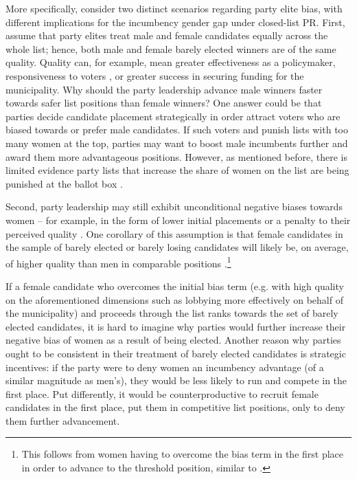 \documentclass[12pt]{article}
\begin{document}
More specifically, consider two distinct scenarios regarding party elite bias, with different implications for the incumbency gender gap under closed-list PR. First, assume that party elites treat male and female candidates equally across the whole list; hence, both male and female barely elected winners are of the same quality. Quality can, for example, mean greater effectiveness as a policymaker, responsiveness to voters \citep{anzia2011}, or greater success in securing funding for the municipality. Why should the party leadership advance male winners faster towards safer list positions than female winners? One answer could be that parties decide candidate placement strategically in order attract voters who are biased towards or prefer male candidates. If such voters and punish lists with too many women at the top, parties may want to boost male incumbents further and award them more advantageous positions. However, as mentioned before, there is limited evidence party lists that increase the share of women on the list are being punished at the ballot box \citep{bagues2020a}.


Second, party leadership may still exhibit unconditional negative biases towards women -- for example, in the form of lower initial placements or a penalty to their perceived quality \citep{luhiste2015,murray2012,krook2014}. One corollary of this assumption is that female candidates in the sample of barely elected or barely losing candidates will likely be, on average, of higher quality than men in comparable positions \citep{ashworth2021,besley2017}.\footnote{This follows from women having to overcome the bias term in the first place in order to advance to the threshold position, similar to \citet{ashworth2021}.}

If a female candidate who overcomes the initial bias term (e.g. with high quality on the aforementioned dimensions such as lobbying more effectively on behalf of the municipality) and proceeds through the list ranks towards the set of barely elected candidates, it is hard to imagine why parties would further increase their negative bias of women as a result of being elected. Another reason why parties ought to be consistent in their treatment of barely elected candidates is strategic incentives: if the party were to deny women an incumbency advantage (of a similar magnitude as men's), they would be less likely to run and compete in the first place. Put differently, it would be counterproductive to recruit female candidates in the first place, put them in competitive list positions, only to deny them further advancement.
\end{document}
